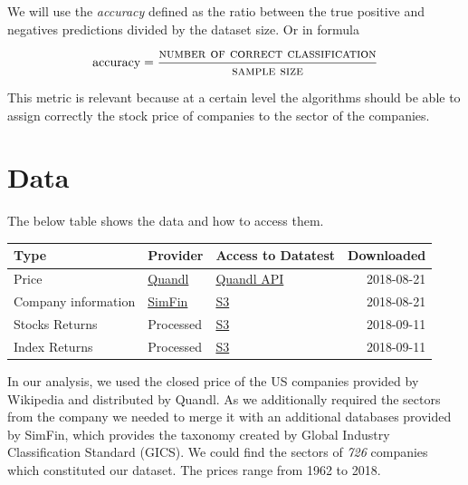 \documentclass[a4paper,twoside]{article}
\begin{document}
We will use the \emph{accuracy} defined as the ratio between the true positive and
negatives predictions divided by the dataset size. Or in formula

\begin{align*}
  \textrm{accuracy} = \frac{\textsc{number of correct classification} }{\textsc{sample size}}
\end{align*}

This metric is relevant because at a certain level the algorithms should be
able to assign correctly the stock price of companies to the sector of the
companies.


\section{Data}
\label{sec:org1f892c8}

The below table shows the data and how to access them.

\begin{center}
\begin{tabular}{lllr}
Type & Provider & Access to Datatest & Downloaded\\
\hline
Price & \href{https://www.quandl.com/databases/WIKIP/documentation/about}{Quandl} & \href{https://www.quandl.com/databases/WIKIP}{Quandl API} & 2018-08-21\\
Company information & \href{https://simfin.com/data/find/}{SimFin} & \href{https://s3.us-east-2.amazonaws.com/udacity-capstone-data-davidpham87/data/company\_fundamentals.csv}{S3} & 2018-08-21\\
Stocks Returns & Processed & \href{https://s3.us-east-2.amazonaws.com/udacity-capstone-data-davidpham87/data/wiki\_stocks\_returns.csv}{S3} & 2018-09-11\\
Index Returns & Processed & \href{https://s3.us-east-2.amazonaws.com/udacity-capstone-data-davidpham87/data/wiki\_indices\_returns.csv}{S3} & 2018-09-11\\
\hline
\end{tabular}
\end{center}

In our analysis, we used the closed price of the US companies provided by
Wikipedia and distributed by Quandl. As we additionally required the sectors
from the company we needed to merge it with an additional databases provided by
SimFin, which provides the taxonomy created by Global Industry Classification
Standard (GICS). We could find the sectors of \emph{726} companies which
constituted our dataset. The prices range from 1962 to 2018.
\end{document}
